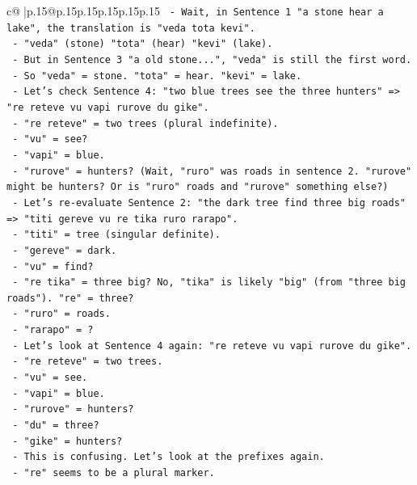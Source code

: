 \documentclass{article}
\begin{document}
{\begin{supertabular}{c@{$\;$}|p{.15\linewidth}@{}p{.15\linewidth}p{.15\linewidth}p{.15\linewidth}p{.15\linewidth}p{.15\linewidth}}
{{{\texttt{    {-} Wait, in Sentence 1 "a stone hear a lake", the translation is "veda tota kevi".} \\
\texttt{      {-} "veda" (stone) "tota" (hear) "kevi" (lake).} \\
\texttt{      {-} But in Sentence 3 "a old stone...", "veda" is still the first word.} \\
\texttt{      {-} So "veda" = stone. "tota" = hear. "kevi" = lake.} \\
\texttt{  {-} Let's check Sentence 4: "two blue trees see the three hunters" => "re reteve vu vapi rurove du gike".} \\
\texttt{    {-} "re reteve" = two trees (plural indefinite).} \\
\texttt{    {-} "vu" = see?} \\
\texttt{    {-} "vapi" = blue.} \\
\texttt{    {-} "rurove" = hunters? (Wait, "ruro" was roads in sentence 2. "rurove" might be hunters? Or is "ruro" roads and "rurove" something else?)} \\
\texttt{    {-} Let's re{-}evaluate Sentence 2: "the dark tree find three big roads" => "titi gereve vu re tika ruro rarapo".} \\
\texttt{      {-} "titi" = tree (singular definite).} \\
\texttt{      {-} "gereve" = dark.} \\
\texttt{      {-} "vu" = find?} \\
\texttt{      {-} "re tika" = three big? No, "tika" is likely "big" (from "three big roads"). "re" = three?} \\
\texttt{      {-} "ruro" = roads.} \\
\texttt{      {-} "rarapo" = ?} \\
\texttt{      {-} Let's look at Sentence 4 again: "re reteve vu vapi rurove du gike".} \\
\texttt{        {-} "re reteve" = two trees.} \\
\texttt{        {-} "vu" = see.} \\
\texttt{        {-} "vapi" = blue.} \\
\texttt{        {-} "rurove" = hunters?} \\
\texttt{        {-} "du" = three?} \\
\texttt{        {-} "gike" = hunters?} \\
\texttt{      {-} This is confusing. Let's look at the prefixes again.} \\
\texttt{      {-} "re" seems to be a plural marker.} \\
}}}
\end{supertabular}}
\end{document}
